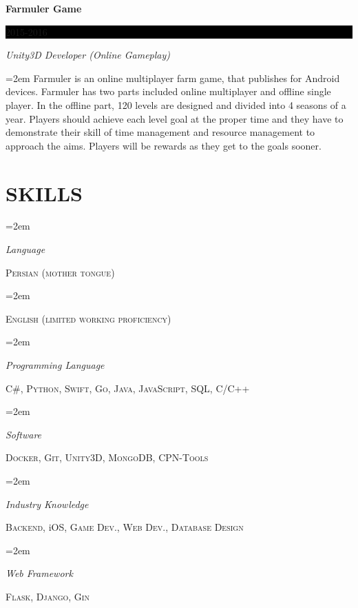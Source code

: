\documentclass[paper=a4,fontsize=11pt]{scrartcl} %
\newlength{\spacebox}
\newcommand{\sepspace}{\vspace*{1em}}        %
\newcommand{\NewPart}[1]{\section*{\uppercase{#1}}}
\newcommand{\PersonalEntry}[2]{
        \noindent\hangindent=2em\hangafter=0 %
        \parbox{\spacebox}{        %
        \textit{#1}}               %
        \hspace{1.5em} #2 \par}    %
\newcommand{\SkillsEntry}[2]{      %
        \noindent\hangindent=2em\hangafter=0 %
        \parbox{\spacebox}{        %
        \textit{#1}}               %
        \hspace{1.5em} #2 \par}    %
\newcommand{\EducationEntry}[4]{
        \noindent \textbf{#1} \hfill      %
        \colorbox{Black}{%
            \parbox{6em}{%
            \hfill\color{White}#2}} \par  %
        \noindent \textit{#3} \par        %
        \noindent\hangindent=2em\hangafter=0 \small #4 %
        \normalsize \par}
\newcommand{\ExperienceEntry}[4]{         %
        \noindent \textbf{#1} \hfill      %
        \colorbox{Black}{%
            \parbox{6em}{%
            \hfill\color{White}#2}} \par      %
        \noindent \textit{#3} \par        %
        \noindent\hangindent=2em\hangafter=0 \small #4 %
        \normalsize \par}
\begin{document}
\ExperienceEntry{Farmuler Game}{2015-2016}{Unity3D Developer (Online Gameplay)}{Farmuler is an online multiplayer farm game, that publishes for Android devices. Farmuler has two parts included online multiplayer and offline single player. In the offline part, 120 levels are designed and divided into 4 seasons of a year. Players should achieve each level goal at the proper time and they have to demonstrate their skill of time management and resource management to approach the aims. Players will be rewards as they get to the goals sooner.}
\sepspace

\NewPart{Skills}{}

\SkillsEntry{Language}{\textsc{Persian (mother tongue)}}
\SkillsEntry{}{\textsc{English (limited working proficiency)}}
\sepspace

\SkillsEntry{Programming Language}{\textsc{C\#}, \textsc{Python}, \textsc{Swift}, \textsc{Go}, \textsc{Java}, \textsc{JavaScript}, \textsc{SQL}, \textsc{C/C++}}
\sepspace

\SkillsEntry{Software}{\textsc{Docker}, \textsc{Git}, \textsc{Unity3D}, \textsc{MongoDB}, \textsc{CPN-Tools}}
\sepspace

\SkillsEntry{Industry Knowledge}{\textsc{Backend}, iOS, \textsc{Game Dev.}, \textsc{Web Dev.}, \textsc{Database Design}}
\sepspace

\SkillsEntry{Web Framework}{\textsc{Flask}, \textsc{Django}, \textsc{Gin}}
\sepspace
\end{document}
